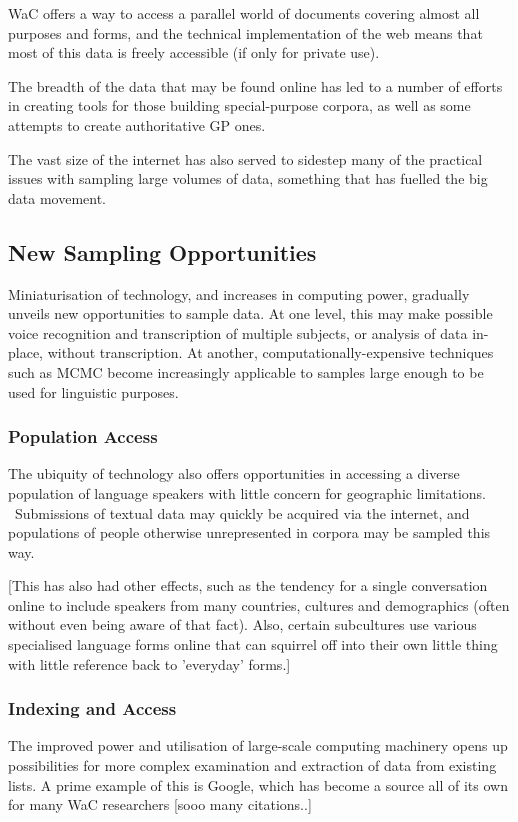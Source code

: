WaC offers a way to access a parallel world of documents covering almost all purposes and forms, and the technical implementation of the web means that most of this data is freely accessible (if only for private use).

The breadth of the data that may be found online has led to a number of efforts in creating tools for those building special-purpose corpora, as well as some attempts to create authoritative GP ones.

The vast size of the internet has also served to sidestep many of the practical issues with sampling large volumes of data, something that has fuelled the big data movement.  




\subsection{New Sampling Opportunities}
Miniaturisation of technology, and increases in computing power, gradually unveils new opportunities to sample data.  At one level, this may make possible voice recognition and transcription of multiple subjects, or analysis of data in-place, without transcription.  At another, computationally-expensive techniques such as MCMC become increasingly applicable to samples large enough to be used for linguistic purposes.


\subsubsection{Population Access}
The ubiquity of technology also offers opportunities in accessing a diverse population of language speakers with little concern for geographic limitations.  Submissions of textual data may quickly be acquired via the internet, and populations of people otherwise unrepresented in corpora may be sampled this way.

[This has also had other effects, such as the tendency for a single conversation online to include speakers from many countries, cultures and demographics (often without even being aware of that fact).  Also, certain subcultures use various specialised language forms online that can squirrel off into their own little thing with little reference back to 'everyday' forms.]



\subsubsection{Indexing and Access}
The improved power and utilisation of large-scale computing machinery opens up possibilities for more complex examination and extraction of data from existing lists.  A prime example of this is Google, which has become a source all of its own for many WaC researchers [sooo many citations..]

